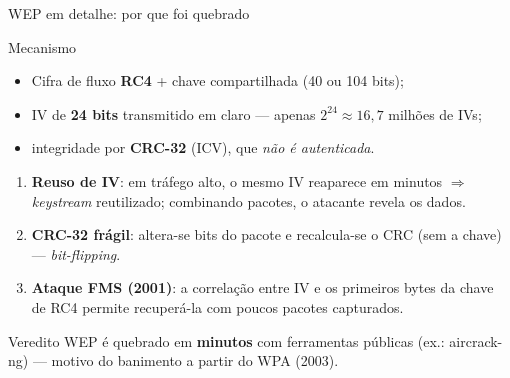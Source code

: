 \documentclass[aspectratio=169,11pt]{beamer}
\begin{document}
\begin{frame}{WEP em detalhe: por que foi quebrado}
  \begin{block}{Mecanismo}
    \begin{itemize}
      \item Cifra de fluxo \textbf{RC4} + chave compartilhada (40 ou 104 bits);
      \item IV de \textbf{24 bits} transmitido em claro --- apenas $2^{24}\approx 16{,}7$ milhões de IVs;
      \item integridade por \textbf{CRC-32} (ICV), que \emph{não é autenticada}.
    \end{itemize}
  \end{block}
  \begin{enumerate}
    \item \textbf{Reuso de IV}: em tráfego alto, o mesmo IV reaparece em minutos $\Rightarrow$ \emph{keystream} reutilizado; combinando pacotes, o atacante revela os dados.
    \item \textbf{CRC-32 frágil}: altera-se bits do pacote e recalcula-se o CRC (sem a chave) --- \emph{bit-flipping}.
    \item \textbf{Ataque FMS (2001)}: a correlação entre IV e os primeiros bytes da chave de RC4 permite recuperá-la com poucos pacotes capturados.
  \end{enumerate}
  \pause
  \begin{alertblock}{Veredito}
    WEP é quebrado em \textbf{minutos} com ferramentas públicas (ex.: aircrack-ng) --- motivo do banimento a partir do WPA (2003).
  \end{alertblock}
\end{frame}
\end{document}
